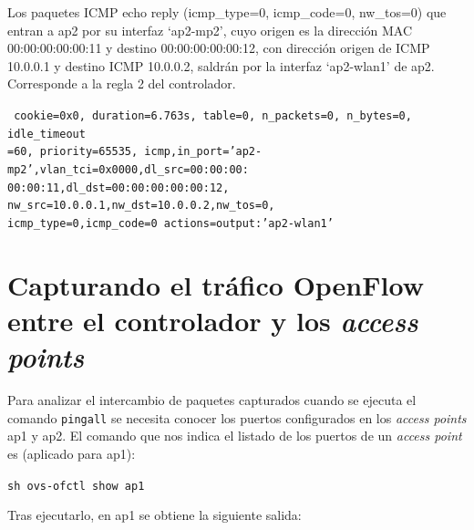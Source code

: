 \documentclass[a4paper,12pt,twoside,spanish]{book}
\begin{document}
Los paquetes ICMP echo reply (icmp\_type=0, icmp\_code=0, nw\_tos=0) que entran a ap2 por su interfaz ‘ap2-mp2’, cuyo origen es la dirección MAC 00:00:00:00:00:11 y destino 00:00:00:00:00:12, con dirección origen de ICMP 10.0.0.1 y destino ICMP 10.0.0.2, saldrán por la interfaz ‘ap2-wlan1’ de ap2. Corresponde a la regla 2 del controlador. \par 

\noindent\texttt{
	cookie=0x0, duration=6.763s, table=0, n\_packets=0, n\_bytes=0, idle\_timeout\\
	=60, priority=65535,
	icmp,in\_port='ap2-mp2',vlan\_tci=0x0000,dl\_src=00:00:00:\\
	00:00:11,dl\_dst=00:00:00:00:00:12,
	nw\_src=10.0.0.1,nw\_dst=10.0.0.2,nw\_tos=0,\\
	icmp\_type=0,icmp\_code=0 actions=output:'ap2-wlan1'
}









\section{Capturando el tráfico OpenFlow entre el controlador y los \textit{access points}}\label{sect:capt_of}

Para analizar el intercambio de paquetes capturados cuando se ejecuta el comando \texttt{pingall} se necesita conocer los puertos configurados en los \textit{access points} ap1 y ap2. El comando que nos indica el listado de los puertos de un \textit{access point} es (aplicado para ap1):\par 

\begin{center}
	\texttt{sh ovs-ofctl show ap1}
\end{center}

Tras ejecutarlo, en ap1 se obtiene la siguiente salida:
\end{document}
